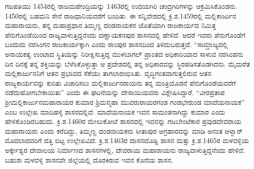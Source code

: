 ಗಜಪತಿಯು 1454ರಲ್ಲಿ ರಾಜಮಹೇಂದ್ರಿಯನ್ನು 1463ರಲ್ಲಿ ಉದಯಗಿರಿ ಚಂದ್ರಗಿರಿಗಳನ್ನು ಆಕ್ರಮಿಸಿಕೊಂಡನು. 1450ರಲ್ಲಿ ಬಹಮನಿ ಸೇನೆ ರಾಜಧಾನಿಯವರೆಗೆ ಬಂದಿತು. ಈ ಸನ್ನಿವೇಶದಲ್ಲಿ ಕ್ರಿ.ಶ.1459ರಲ್ಲಿ ಮಲ್ಲಿಕಾರ್ಜುನ ಮಹಾರಾಯನು, ತನ್ನ ಮಹಾಪ್ರಧಾನ ತಿಮ್ಮಣ್ಣ ದಂಡನಾಯಕನ ಜೊತೆಯಾಗಿ ರಾಜಕಾರ್ಯದ ನಿಮಿತ್ತ ಪೆನುಗೊಂಡೆಯಿಂದ ರಾಜ್ಯವಾಳುತ್ತಿದ್ದನೆಂದು ದಣ್ಣಾಯಕನಪುರ ಶಾಸನದಲ್ಲಿ ಹೇಳಿದೆ. ಆದರೆ ಇವರು ಪೆನುಗೊಂಡೆಗೆ ಬಂದುದು ನರಸಿಂಗನ ರಾಜಕಾರ್ಯಕ್ಕಾಗಿ ಎಂದು ರಾಂಪುರ ಶಾಸನದಿಂದ ತಿಳಿದುಬರುತ್ತದೆ. “ಸಾಮ್ರಾಜ್ಯದಲ್ಲಿ ಅನಾಯಕತ್ವ ಉಂಟಾದ ಸ್ಥಿತಿಯನ್ನು ನಿರೀಕ್ಷಿಸುತ್ತಿದ್ದ ಮುಳಬಾಗಲ್​ ಪ್ರಾಂತದ ಅಧಿಕಾರಿಯಾದ ಸಾಳುವ ನರಸಿಂಹನು ದಿನ ದಿನಕ್ಕೆ ತನ್ನ ಶಕ್ತಿಯನ್ನು ಬೆಳೆಸಿಕೊಳ್ಳುತ್ತಾ ಆ ಪ್ರದೇಶದಲ್ಲಿ ತನ್ನ ಅಧಿಕಾರವನ್ನು ಸ್ಥಿರಪಡಿಸತೊಡಗಿದನು. ಮೈಮರೆತ ಮಲ್ಲಿಕಾರ್ಜುನನಿಗೆ ಆತನ ಪ್ರಭಾವದ ಸೆಕೆಯು ತಾಗಲಾರಂಭಿಸಿತು. ವೃದ್ಧಿಗಂತವಾಗುತ್ತಲಿರುವ ಆತನ ರಾಜ್ಯಕಾರ್ಯವನ್ನು ಕುರಿತು ವಿಚಾರಿಸಲು ಮಲ್ಲಿಕಾರ್ಜುನರಾಯನು ತನ್ನ ಮಂತ್ರಿಯೊಡನೆ ಪೆನುಗೊಂಡೆಯವರೆಗೆ ನಡೆದುಹೋಗಬೇಕಾಯಿತು” ಎಂದು ಈ ಘಟನೆಯನ್ನು ದೇಸಾಯಿಯವರು ವಿಶ್ಲೇಷಿಸಿದ್ದಾರೆ. “ವೀರಪ್ರತಾಪ ಶ‍್ರೀಮಲ್ಲಿಕಾರ್ಜುನಮಹಾರಾಯರ ಕುಮಾರ ಶ್ರಿಮನ್ಮಹಾ ಮುವರುರಾಯರಗಂಡ ಗಂಡಭೇರುಂಡ ಮಾದೆಯನಾಯಕ” ಎಂಬ ಉಲ್ಲೇಖ ಮಾದಿಹಳ್ಳಿ ಶಾಸನದಲ್ಲಿದೆ. ಮಾದೆಯನಾಯಕ ಇವನ ಸಾಮಂತ\-ನಾಗಿದ್ದು ಕುಮಾರ ಎಂದು ಹೇಳಿಕೊಂಡಿರಬಹುದು. ಕ್ರಿ.ಶ.1460ರ ಮೇಲುಕೋಟೆ ಶಾಸನದಲ್ಲಿ ಇವನನ್ನು ಗಜಬೇಂಟೆಕಾರ ಪ್ರವುಡದೇವರಾಯ ಮಹಾರಾಯರು ಎಂದು ಕರೆದಿದ್ದು, ತಿಮ್ಮಣ್ಣ ದಂಡನಾಯಕನು ಸೀತಾಪುರ ಅಗ್ರಹಾರವನ್ನು ಮಾಡಿ ಅನಂತ ಆಳ್ವಾರ್​ ಮೊದಲಾದವರಿಗೆ ದತ್ತಿ ಬಿಟ್ಟ ಉಲ್ಲೇಖವಿದೆ. ಕ್ರಿ.ಶ.1463ರ ದಾಸನದೊಡ್ಡಿ ಶಾಸನ ಮತ್ತು ಕ್ರಿ.ಶ.1465ರ ಮಳವಳ್ಳಿಯ ಅರ್ಕ್ಕೇಶ್ವರ ದೇವಾಲಯ ನಿರ್ಮಾಣದ ಶಾಸನಗಳಲ್ಲಿ, ದೇವರಾಯ ಮಹಾರಾಯನು ರಾಜ್ಯವಾಳುತ್ತಿದ್ದನೆಂದು ಹೇಳಿವೆ. ಬಹುಶಃ ಮಳವಳ್ಳಿ ಶಾಸನವೇ ಜಿಲ್ಲೆಯಲ್ಲಿ ದೊರಕಿರುವ ಇವನ ಕೊನೆಯ ಶಾಸನ.

